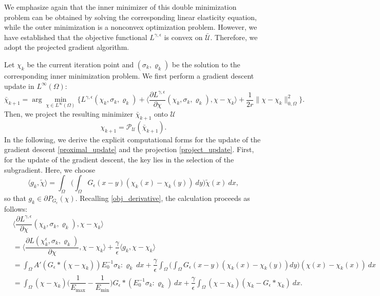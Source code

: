 \documentclass{amsart}
\begin{document}
 We emphasize again that the inner minimizer of this double minimization problem can be obtained by solving the corresponding linear elasticity equation, while the outer minimization is a nonconvex optimization problem. However, we have established that the objective functional $L^{\gamma,\epsilon}$ is convex on \(\bar{\mathcal{U}}\). Therefore, we adopt the projected gradient algorithm. 
 
 Let \(\chi_k\) be the current iteration point and \((\sigma_k, \varrho_k)\) be the solution to the corresponding inner minimization problem. We first perform a gradient descent update in \(L^\infty(\Omega)\): 
 \begin{equation}\label{proximal_update}
     \bar\chi_{k+1} = \arg\min_{\chi\in L^\infty(\Omega)}\Big\{L^{\gamma,\epsilon}(\chi_k,\sigma_k,\varrho_k)+\Big\langle\dfrac{\partial L^{\gamma,\epsilon}}{\partial \chi}(\chi_k,\sigma_k,\varrho_k),\chi-\chi_k\Big\rangle +\dfrac{1}{2r}\|\chi-\chi_k\|_{0,\Omega}^2\Big\}.
 \end{equation}
 Then, we project the resulting minimizer \(\bar{\chi}_{k+1}\) onto \(\mathcal{U}\)
 \begin{equation}\label{project_update}
     \chi_{k+1}=\mathcal{P}_\mathcal{U}(\bar\chi_{k+1}).
 \end{equation}
In the following, we derive the explicit computational forms for the update of the gradient descent \eqref{proximal_update} and the projection \eqref{project_update}. First, for the update of the gradient descent, the key lies in the selection of the subgradient. Here, we choose
\begin{equation}
\langle g_k,\tilde{\chi}\rangle =  \int_\Omega \Big(\int_\Omega G_\epsilon(x-y) (\chi_k(x)-\chi_k(y))\ dy\Big)\tilde{\chi}(x)\ dx,\nonumber
\end{equation}
so that $g_k\in \partial P_{G_\epsilon}(\chi)$. Recalling \eqref{obj_derivative},  the calculation proceeds as follows:
\begin{align*}
    &\Big\langle \dfrac{\partial L^{\gamma,\epsilon}}{\partial \chi}(\chi_k,\sigma_k,\varrho_k),\chi-\chi_k\Big\rangle\\
    &=\Big\langle \dfrac{\partial L(\chi_k^\epsilon,\sigma_k,\varrho_k)}{\partial\chi},\chi-\chi_k\Big\rangle + \dfrac{\gamma}{\epsilon}\langle g_k,\chi-\chi_k\rangle\\
    &=\int_\Omega A'(G_\epsilon*(\chi-\chi_k))E_0^{-1}\sigma_k:\varrho_k\ dx + \dfrac{\gamma}{\epsilon}\int_\Omega \Big(\int_\Omega G_\epsilon(x-y) (\chi_k(x)-\chi_k(y)) dy\Big)(\chi(x)-\chi_k(x))\ dx\\
    &=\int_\Omega(\chi-\chi_k)\Big(\dfrac{1}{E_{\max}}-\dfrac{1}{E_{\min}}\Big)G_\epsilon*(E_0^{-1}\sigma_k:\varrho_k)\ dx +\dfrac{\gamma}{\epsilon}\int_\Omega (\chi-\chi_k)(\chi_k-G_\epsilon*\chi_k)\ dx.
\end{align*}
\end{document}
